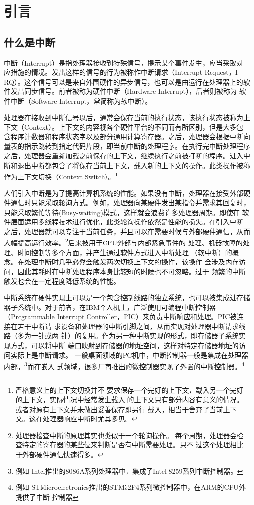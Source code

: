 
\chapter{引言}

\section{什么是中断}
中断（Interrupt）是指处理器接收到特殊信号，提示某个事件发生，应当采取对
应措施的情况。发出这样的信号的行为被称作中断请求（Interrupt Request，I
RQ）。这个信号可以是来自外围硬件的异步信号，也可以是由运行在处理器上的软
件发出同步信号。前者被称为硬件中断（Hardware Interrupt），后者则被称为
软件中断（Software Interrupt，常简称为软中断）。

处理器在接收到中断信号以后，通常会保存当前的执行状态，该执行状态被称为上
下文（Context）。上下文的内容视各个硬件平台的不同而有所区别，但是大多包
含程序计数器和程序状态字以及部分通用计算寄存器。之后，处理器会根据中断向
量表的指示跳转到指定代码片段，即当前中断的处理程序。在执行完中断处理程序
之后，处理器会重新加载之前保存的上下文，继续执行之前被打断的程序。进入中
断和退出中断都包含了将保存当前上下文，载入新的上下文的操作。此类操作被称
作为上下文切换（Context Switch）。\footnote{严格意义上的上下文切换并不
要求保存一个完好的上下文，载入另一个完好的上下文，实际情况中经常发生载入
的上下文只有部分内容有意义的情况。或者对原有上下文并未做出妥善保存即另行
载入，相当于舍弃了当前上下文。这在处理器响应中断时尤其多见。}

人们引入中断是为了提高计算机系统的性能。如果没有中断，处理器在接受外部硬
件通信时只能采取轮询方式。例如，处理器向某硬件发出某指令并需求其回复时，
只能采取繁忙等待(Busy-waiting)模式，这样就会浪费许多处理器周期。即使在
软件层面运用多线程技术进行优化，此类轮询操作依然是性能的损失。在引入中断
之后，处理器就可以专注于当前任务，并且可以在需要时候与外部硬件通信，从而
大幅提高运行效率。\footnote{处理器检查中断的原理其实也类似于一个轮询操作。
每个周期，处理器会检查特定的寄存器的某些位来判断是否有中断需要处理。只不
过这个处理相比于外部硬件通信快速得多。}后来被用于CPU外部与内部紧急事件的
处理、机器故障的处理、时间控制等多个方面，并产生通过软件方式进入中断处理
（软中断）的概念。在处理中断时几乎必然会触发两次切换上下文的操作，该操作
会涉及内存访问，因此其耗时在中断处理程序本身比较短的时候也不可忽略。过于
频繁的中断触发也会在一定程度降低系统的性能。

中断系统在硬件实现上可以是一个包含控制线路的独立系统，也可以被集成进存储
器子系统中。对于前者，在IBM个人机上，广泛使用可编程中断控制器（Programmable 
Interrupt Controller，PIC）来负责中断响应和处理。PIC被连接在若干中断请
求设备和处理器的中断引脚之间，从而实现对处理器中断请求线路（多为一针或两
针）的复用。作为另一种中断实现的形式，即存储器子系统实现方式，可以将中断
端口映射到存储器的地址空间，这样对特定存储器地址的访问实际上是中断请求。
一般桌面领域的PC机中，中断控制器一般是集成在处理器内部，\footnote{例如
Intel推出的8086A系列处理器中，集成了Intel 8259系列中断控制器。}而在嵌入
式领域，很多厂商推出的微控制器实现了外置的中断控制器。\footnote{例如
STMicroelectronics推出的STM32F4系列微控制器中，在ARM的CPU外提供了中断
控制器}

